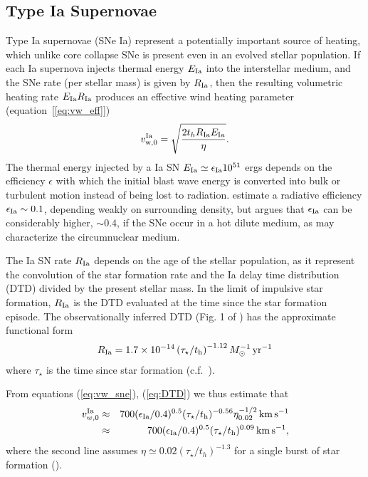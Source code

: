 \documentclass[usenatbib,fleqn]{mn2e}
\newcommand{\RateIa}{R_{\rm Ia}}
\begin{document}
\subsection{Type Ia Supernovae} 

Type Ia supernovae (SNe Ia) represent a potentially important source of heating, which unlike core collapse SNe is present even in an evolved stellar population.  If each Ia supernova injects thermal energy $E_{\rm Ia}$ into the interstellar medium, and the SNe rate (per stellar mass) is given by $R_{\rm   Ia}$, then the resulting volumetric heating rate $E_{\rm Ia}R_{\rm  Ia}$ produces an effective wind heating parameter (equation~[\ref{eq:vw_eff}]) \begin{align} v_{\rm w,0}^{\rm Ia} =\sqrt{\frac{2 t_h R_{\rm Ia}
E_{\rm Ia}}{\eta}} \label{eq:vw_sne}.
\end{align} The thermal energy injected by a Ia SN $E_{\rm Ia} \simeq
\epsilon_{\rm Ia} 10^{51}$ ergs depends on the efficiency $\epsilon$
with which the initial blast wave energy is converted into bulk or turbulent
motion instead of being lost to radiation.  \cite{Thornton+98}
estimate a radiative efficiency $\epsilon_{\rm Ia} \sim 0.1$,
depending weakly on surrounding density, but \citet{Sharma+14} argues
that $\epsilon_{\rm Ia}$ can be considerably higher, $\sim 0.4$, if
the SNe occur in a hot dilute medium, as may characterize the circumnuclear medium.

The Ia SN rate $\RateIa$ depends on the age of the stellar population, as it represent the convolution of the star formation rate and the Ia delay time distribution (DTD) divided by the present stellar mass.  In
the limit of impulsive star formation, $\RateIa$ is the DTD evaluated at the time since the star formation episode.  The observationally inferred DTD (Fig. 1 of \citealt{MaozMannucci+:2012a}) has the
approximate functional form \begin{align}
  R_{\rm Ia} =1.7\times 10^{-14}\left(\tau_{\star}/t_{\rm
      h}\right)^{-1.12} M_{\odot}^{-1}\,{\rm yr^{-1}}
\label{eq:DTD}
  \end{align}
  where $\tau_{\star}$ is the time since star formation
  (c.f.~\citealt{Scannapieco&Bildsten05}). 

From equations (\ref{eq:vw_sne}), (\ref{eq:DTD}) we thus estimate that 
  \begin{eqnarray} 
    v_{w,0}^{\rm Ia} &\approx& 700(\epsilon_{\rm
      Ia}/0.4)^{0.5}(\tau_{\star}/t_{\rm h})^{-0.56}\eta_{0.02}^{-1/2}\,{\rm km
      \,s^{-1}} \nonumber \\
&\approx& 700(\epsilon_{\rm
      Ia}/0.4)^{0.5}(\tau_{\star}/t_{\rm h})^{0.09}\,{\rm km
      \,s^{-1}},
\label{eq:vIa}
  \end{eqnarray}
where the second line assumes $\eta\simeq 0.02 (\tau_{\star}/t_h)^{-1.3}$ for a single burst of star formation (\citealt{Ciotti+91}).
\end{document}
